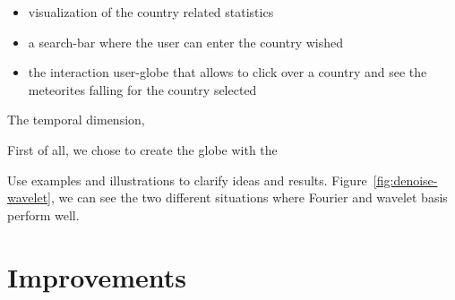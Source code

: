 \documentclass[10pt,conference,compsocconf]{IEEEtran}
\begin{document}
\begin{itemize}
\item visualization of the country related statistics
\item a search-bar where the user can enter the country wished
\item the interaction user-globe that allows to click over a country and see the meteorites falling for the country selected 
\end{itemize}


The temporal dimension, 



First of all, we chose to create the globe with the

Use examples and illustrations to clarify ideas and results. Figure~\ref{fig:denoise-wavelet}, we can see the two different situations where Fourier and wavelet basis perform well.

\section{Improvements}
\label{sec:improvements}
\end{document}
